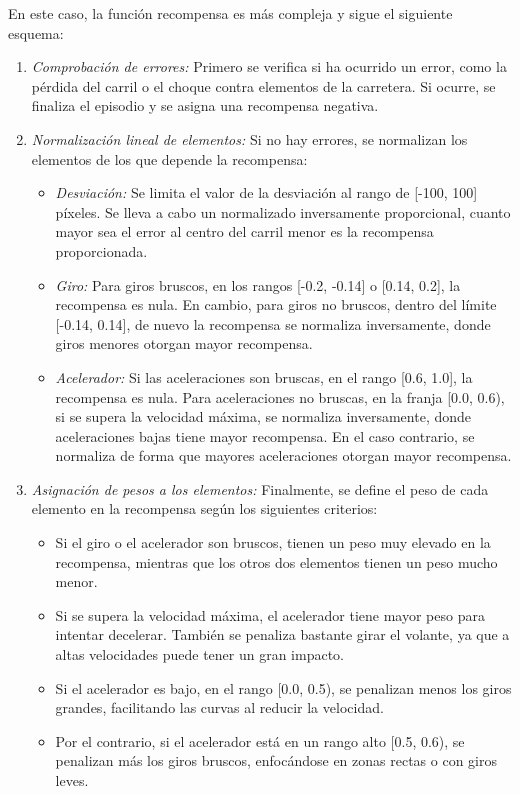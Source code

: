 En este caso, la función recompensa es más compleja y sigue el siguiente esquema:
\begin{enumerate}
\item \textit{Comprobación de errores:} Primero se verifica si ha ocurrido un error, como la pérdida del carril o el choque contra elementos de la carretera. Si ocurre, se finaliza el episodio y se asigna una recompensa negativa.
\item \textit{Normalización lineal de elementos:} Si no hay errores, se normalizan los elementos de los que depende la recompensa:
\begin{itemize}
\item \textit{Desviación:} Se limita el valor de la desviación al rango de [-100, 100] píxeles. Se lleva a cabo un normalizado inversamente proporcional, cuanto mayor sea el error al centro del carril menor es la recompensa proporcionada.
\item \textit{Giro:} Para giros bruscos, en los rangos [-0.2, -0.14] o [0.14, 0.2], la recompensa es nula. En cambio, para giros no bruscos, dentro del límite [-0.14, 0.14], de nuevo la recompensa se normaliza inversamente, donde giros menores otorgan mayor recompensa.
\item \textit{Acelerador:} Si las aceleraciones son bruscas, en el rango [0.6, 1.0], la recompensa es nula. Para aceleraciones no bruscas, en la franja [0.0, 0.6), si se supera la velocidad máxima, se normaliza inversamente, donde aceleraciones bajas tiene mayor recompensa. En el caso contrario, se normaliza de forma que mayores aceleraciones otorgan mayor recompensa.
\end{itemize}

\item \textit{Asignación de pesos a los elementos:} Finalmente, se define el peso de cada elemento en la recompensa según los siguientes criterios:
\begin{itemize}
\item Si el giro o el acelerador son bruscos, tienen un peso muy elevado en la recompensa, mientras que los otros dos elementos tienen un peso mucho menor.
\item Si se supera la velocidad máxima, el acelerador tiene mayor peso para intentar decelerar. También se penaliza bastante girar el volante, ya que a altas velocidades puede tener un gran impacto.
\item Si el acelerador es bajo, en el rango [0.0, 0.5), se penalizan menos los giros grandes, facilitando las curvas al reducir la velocidad.
\item Por el contrario, si el acelerador está en un rango alto [0.5, 0.6), se penalizan más los giros bruscos, enfocándose en zonas rectas o con giros leves.
\end{itemize}
\end{enumerate}

